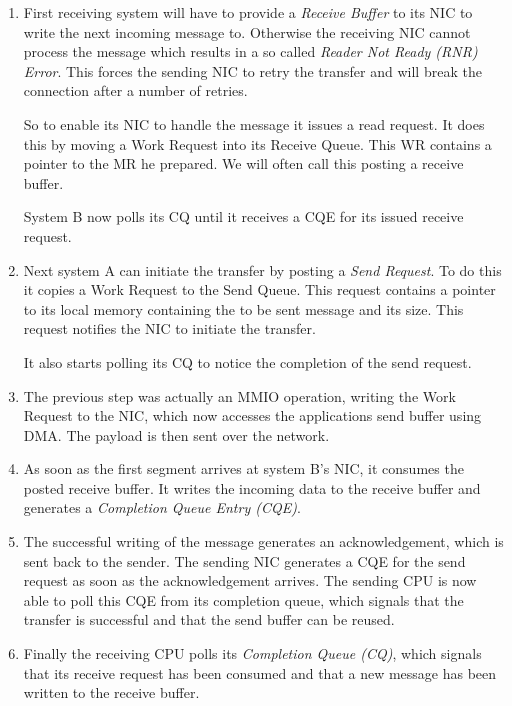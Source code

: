 \begin{enumerate}
  \item First receiving system will have to provide a \emph{Receive Buffer} to its NIC to write the next incoming message to.
    Otherwise the receiving NIC cannot process the message which results in a so called \emph{Reader Not Ready (RNR) Error}.
    This forces the sending NIC to retry the transfer and will break the connection after a number of retries.

    So to enable its NIC to handle the message it issues a read request. It does this by moving a Work Request into its 
    Receive Queue. This WR contains a pointer to the MR he prepared. We will often call this posting a receive buffer. 

    System B now polls its CQ until it receives a CQE for its issued receive request.

  \item Next system A can initiate the transfer by posting a \emph{Send Request}. To do this it copies a Work Request to 
    the Send Queue. This request contains a pointer to its local memory containing the to be sent message
    and its size. This request notifies the NIC to initiate the transfer.

    It also starts polling its CQ to notice the completion of the send request.

  \item The previous step was actually an MMIO operation, writing the Work Request to the NIC, which now 
    accesses the applications send buffer using DMA. The payload is then sent over the network.

  \item As soon as the first segment arrives at system B's NIC, it consumes the posted receive buffer. It writes the incoming
    data to the receive buffer and generates a \emph{Completion Queue Entry (CQE)}. 

  \item The successful writing of the message generates an acknowledgement, which is sent back to the sender. The sending NIC
    generates a CQE for the send request as soon as the acknowledgement arrives. The sending CPU is now able to poll this CQE
    from its completion queue, which signals that the transfer is successful and that the send buffer can be reused.

  \item Finally the receiving CPU polls its \emph{Completion Queue (CQ)}, which signals that its receive request has been 
    consumed and that a new message has been written to the receive buffer.
\end{enumerate}

